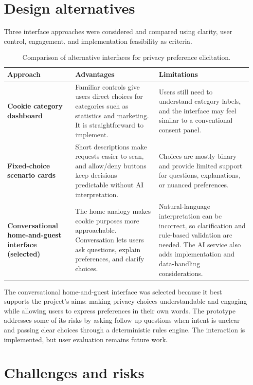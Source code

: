 \documentclass[11pt,a4paper]{report}
\begin{document}
\section{Design alternatives}
Three interface approaches were considered and compared using clarity, user control, engagement, and implementation feasibility as criteria.
\begin{table}[H]
\centering
\small
\caption{Comparison of alternative interfaces for privacy preference elicitation.}
\begin{tabular}{p{}p{}p{}}
\toprule
\textbf{Approach} & \textbf{Advantages} & \textbf{Limitations} \\
\midrule
\textbf{Cookie category dashboard} & Familiar controls give users direct choices for categories such as statistics and marketing. It is straightforward to implement. & Users still need to understand category labels, and the interface may feel similar to a conventional consent panel. \\
\textbf{Fixed-choice scenario cards} & Short descriptions make requests easier to scan, and allow/deny buttons keep decisions predictable without AI interpretation. & Choices are mostly binary and provide limited support for questions, explanations, or nuanced preferences. \\
\textbf{Conversational home-and-guest interface (selected)} & The home analogy makes cookie purposes more approachable. Conversation lets users ask questions, explain preferences, and clarify choices. & Natural-language interpretation can be incorrect, so clarification and rule-based validation are needed. The AI service also adds implementation and data-handling considerations. \\
\bottomrule
\end{tabular}
\end{table}
\begin{samepage}
The conversational home-and-guest interface was selected because it best supports the project's aims: making privacy choices understandable and engaging while allowing users to express preferences in their own words. The prototype addresses some of its risks by asking follow-up questions when intent is unclear and passing clear choices through a deterministic rules engine. The interaction is implemented, but user evaluation remains future work.
\end{samepage}

\section{Challenges and risks}
\end{document}
